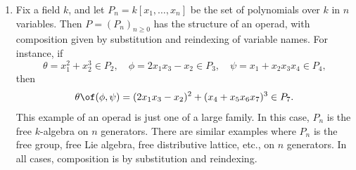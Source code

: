 \begin{examples}
\begin{enumerate}
\item
Fix a field $k$, and let $P_n = k[x_1, \ldots, x_n]$ be the set of
polynomials%
%
%
% 
over $k$ in $n$ variables.  Then $P = (P_n)_{n \geq 0}$ has the
structure of an operad, with composition given by substitution and
reindexing of variable names.  For instance, if
\[
\theta = x_1^2 + x_2^3 \in P_2,
\quad
\phi = 2x_1 x_3 - x_2 \in P_3,
\quad
\psi = x_1 + x_2 x_3 x_4 \in P_4,
\]
then
\[
\theta \of (\phi, \psi)
=
(2x_1 x_3 - x_2)^2 + (x_4 + x_5 x_6 x_7)^3 \in P_7.
\]
This example of an operad is just one of a large family.  In this case,
$P_n$ is the free $k$-algebra on $n$ generators.  There are similar
examples where $P_n$ is the free group, free Lie algebra, free distributive
lattice, etc., on $n$ generators.  In all cases, composition is by
substitution and reindexing.


\end{enumerate}
\end{examples}
